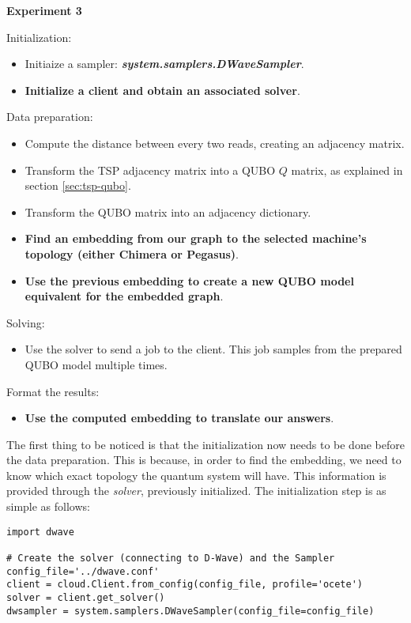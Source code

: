 \begin{algorithm}
	\caption*{\textbf{Experiment 3}}
	
	Initialization:
	\begin{itemize}
		\item Initiaize a sampler: \textbf{\emph{system.samplers.DWaveSampler}}.
		\item \textbf{Initialize a client and obtain an associated solver}.
	\end{itemize}
	
	Data preparation:
	\begin{itemize}
		\item Compute the distance between every two reads, creating an adjacency matrix.
		\item Transform the TSP adjacency matrix into a QUBO $Q$ matrix, as explained in section \ref{sec:tsp-qubo}.
		\item Transform the QUBO matrix into an adjacency dictionary.
		\item \textbf{Find an embedding from our graph to the selected machine's topology (either Chimera or Pegasus)}.
		\item \textbf{Use the previous embedding to create a new QUBO model equivalent for the embedded graph}.
	\end{itemize}
	
	Solving:
	\begin{itemize}
		\item Use the solver to send a job to the client. This job samples from the prepared QUBO model multiple times.
	\end{itemize}
	
	Format the results:
	\begin{itemize}
		\item \textbf{Use the computed embedding to translate our answers}.
	\end{itemize}
\end{algorithm}

The first thing to be noticed is that the initialization now needs to be done before the data preparation. This is because, in order to find the embedding, we need to know which exact topology the quantum system will have. This information is provided through the \emph{solver}, previously initialized. The initialization step is as simple as follows:

\begin{verbatim}
import dwave

# Create the solver (connecting to D-Wave) and the Sampler
config_file='../dwave.conf'
client = cloud.Client.from_config(config_file, profile='ocete')
solver = client.get_solver()
dwsampler = system.samplers.DWaveSampler(config_file=config_file)
\end{verbatim}

